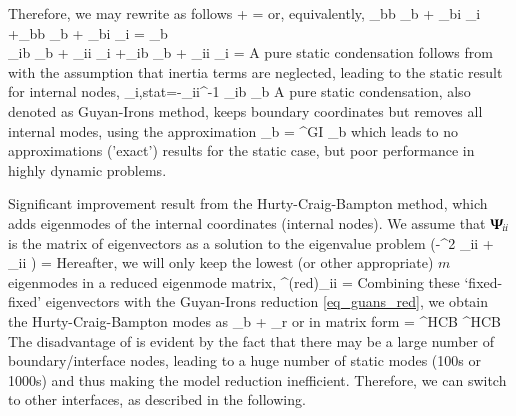 Therefore, we may rewrite  as follows
\be \label{eq_GuyanIrons}
	  +   =   
\ee
or, equivalently,
\bea
	\Mm_{bb} \ddot{\qv}_b + \Mm_{bi} \ddot{\qv}_i +\Km_{bb}  {\qv}_b + \Km_{bi}  {\qv}_i  = {\fv}_b \label{eq_Guyan_bb}\\
	\Mm_{ib} \ddot{\qv}_b + \Mm_{ii} \ddot{\qv}_i +\Km_{ib}  {\qv}_b + \Km_{ii}  {\qv}_i  = \Null \eqDot \label{eq_Guyan_ii}
\eea
A pure static condensation follows from  with the assumption that inertia terms are neglected,
leading to the static result for internal nodes,
\be 
	{\qv}_{i,stat}=-\Km_{ii}^{-1} \Km_{ib} {\qv}_{b} \eqDot 
\ee
A pure static condensation, also denoted as Guyan-Irons method, keeps boundary coordinates but removes all internal modes, using the approximation
\be
	\label{eq_guans_red}
	 \approx {}  \qv_b = \tPsi^{GI} \qv_b \eqComma
\ee
which leads to no approximations ('exact') results for the static case, but poor performance in highly dynamic problems.

Significant improvement result from the Hurty-Craig-Bampton method, which adds eigenmodes of the internal coordinates (internal nodes).
We assume that $\mbox{\boldmath $\Psi$ \unboldmath}\!\!_{ii}$ is the matrix of eigenvectors as a solution to the eigenvalue problem
\be \label{theory:eigenmodes:GEPii}
	\left(-\omega^2 \Mm_{ii} + \Km_{ii} \right) \vv = \Null \eqComma
\ee
Hereafter, we will only keep the lowest (or other appropriate) $m$ eigenmodes in a reduced eigenmode matrix,
\be
  \tPsi^{(red)}_{ii} = 
\ee
Combining these `fixed-fixed' eigenvectors with the Guyan-Irons reduction \eqref{eq_guans_red}, we obtain the 
Hurty-Craig-Bampton modes as
\be
	 \approx {}  \qv_b  +    \pv_{r} \eqComma
\ee
or in matrix form
\be \label{theory:eigenmodes:HCB}
	 \approx {}    = \tPsi^{HCB} \pv^{HCB} \eqDot
\ee
The disadvantage of  is evident by the fact that there may be a large number of boundary/interface nodes, leading to a huge number of static modes (100s or 1000s) and thus making the model reduction inefficient. Therefore, we can switch to other interfaces, as described in the following.

